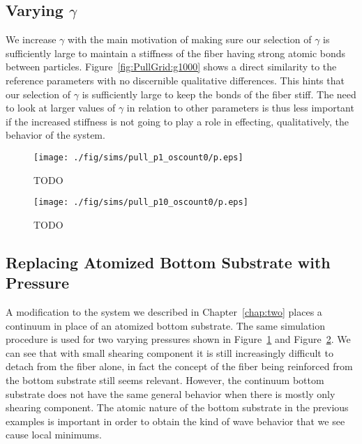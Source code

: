 \subsection{Varying $\gamma$}

We increase $\gamma$ with the main motivation of making sure our selection of $\gamma$ is sufficiently large to maintain a stiffness of the fiber having strong atomic bonds between particles. Figure~\ref{fig:PullGrid:g1000} shows a direct similarity to the reference parameters with no discernible qualitative differences. This hints that our selection of $\gamma$ is sufficiently large to keep the bonds of the fiber stiff. The need to look at larger values of $\gamma$ in relation to other parameters is thus less important if the increased stiffness is not going to play a role in effecting, qualitatively, the behavior of the system.

	\begin{figure}
		\begin{center}
			\texttt{[image: ./fig/sims/pull\_p1\_oscount0/p.eps]}
		\end{center}		
		\caption{ TODO
		\label{fig:PullGrid:p1}}
	\end{figure}
	
	\begin{figure}
		\begin{center}
			\texttt{[image: ./fig/sims/pull\_p10\_oscount0/p.eps]}
		\end{center}		
		\caption{ TODO
		\label{fig:PullGrid:p10}}
	\end{figure}

\subsection{Replacing Atomized Bottom Substrate with Pressure} \label{section:detachment:pressure}

A modification to the system we described in Chapter~\ref{chap:two} places a continuum in place of an atomized bottom substrate. The same simulation procedure is used for two varying pressures shown in Figure~\ref{fig:PullGrid:p1} and Figure~\ref{fig:PullGrid:p10}. We can see that with small shearing component it is still increasingly difficult to detach from the fiber alone, in fact the concept of the fiber being reinforced from the bottom substrate still seems relevant. However, the continuum bottom substrate does not have the same general behavior when there is mostly only shearing component. The atomic nature of the bottom substrate in the previous examples is important in order to obtain the kind of wave behavior that we see cause local minimums.